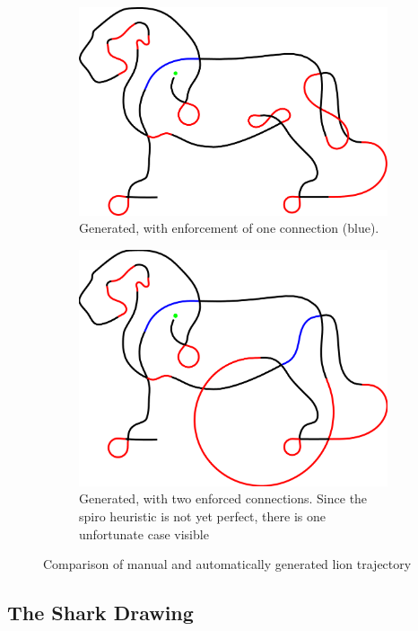 \begin{figure}
\begin{subfigure}[t]{0.45\textwidth}
	\includegraphics[width=\textwidth]{images/results/lion/lion_generated_enforced_connection.pdf}
	\caption{Generated, with enforcement of one connection (blue).}
\end{subfigure}
\begin{subfigure}[t]{0.45\textwidth}
	\includegraphics[width=\textwidth]{images/results/lion/lion_generated_enforced_connection_with_degen.pdf}
	\caption{Generated, with two enforced connections. Since the spiro heuristic is not yet perfect, there is one unfortunate case visible}
\end{subfigure}

\caption{Comparison of manual and automatically generated lion trajectory}
\end{figure}

\subsection{The Shark Drawing}

